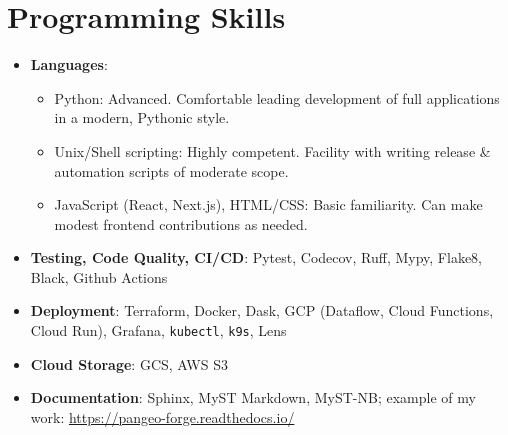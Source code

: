 \documentclass[letterpaper,11pt]{article}
\newcommand{\resumeItem}[2]{
  \item[]\small{
    \textbf{#1}{: #2 \vspace{-2pt}}
  }
}
\newcommand{\resumeSubItem}[2]{\resumeItem{#1}{#2}\vspace{-4pt}}
\newcommand{\resumeSubHeadingListStart}{\begin{itemize}[leftmargin=1pt]}
\newcommand{\resumeSubHeadingListEnd}{\end{itemize}}
\begin{document}
\section{Programming Skills}
  \resumeSubHeadingListStart
    \resumeSubItem{Languages}
      {}
      \begin{itemize}
      \item Python: Advanced. Comfortable leading development of full applications in a modern, Pythonic style.
      \item Unix/Shell scripting: Highly competent. Facility with writing release \& automation scripts of moderate scope.
      \item JavaScript (React, Next.js), HTML/CSS: Basic familiarity. Can make modest frontend contributions as needed.
      \end{itemize}
    \resumeSubItem{Testing, Code Quality, CI/CD}
      {Pytest, Codecov, Ruff, Mypy, Flake8, Black, Github Actions}
    \resumeSubItem{Deployment}
      {Terraform, Docker, Dask, GCP (Dataflow, Cloud Functions, Cloud Run), Grafana, \texttt{kubectl}, \texttt{k9s}, Lens}
    \resumeSubItem{Cloud Storage}
      {GCS, AWS S3}
    \resumeSubItem{Documentation}
      {Sphinx, MyST Markdown, MyST-NB; example of my work: \href{https://pangeo-forge.readthedocs.io/}{https://pangeo-forge.readthedocs.io/}}
  \resumeSubHeadingListEnd


\end{document}
